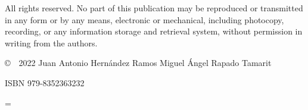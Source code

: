 \documentclass[a4paper,10pt,twoside,english]{book}
\begin{document}
 
    \vfill  
    \begin{minipage}[b]{0.9\textwidth}
        
%        
        
    \end{minipage}
    
    \noindent
    All rights reserved.
    No part of this publication may be reproduced or transmitted in any form or by any means, electronic or mechanical, including photocopy, recording, or any information storage and retrieval system, without permission in writing from the authors. 
    \vspace{2\baselineskip}
    

       \noindent \copyright  \ \ 2022 Juan Antonio Hernández Ramos 
       \hspace{0.7cm}     Miguel Ángel Rapado Tamarit
    
    \vspace{0.5cm}            
    \noindent ISBN 979-8352363232
    \clearpage
    
  
    \frontmatter
    
    
    \parskip = \baselineskip %
    
    \newpage
    \setlength{\parskip}{0pt}
    \tableofcontents
    ~\clearpage
\end{document}
